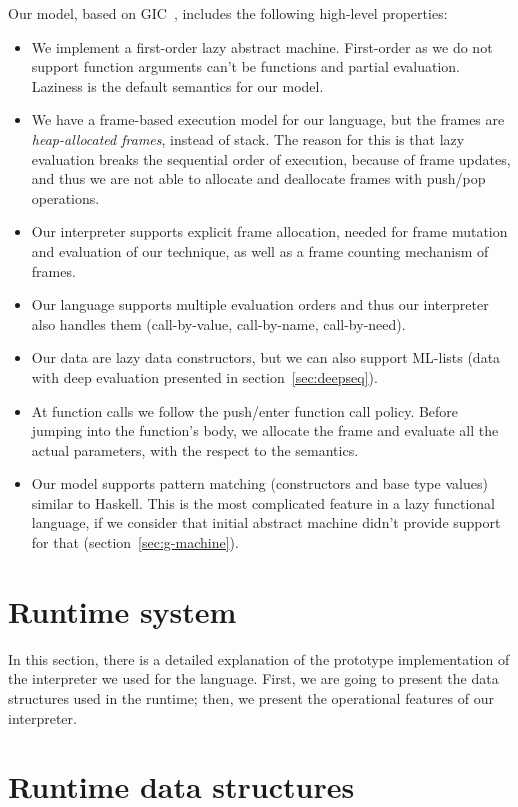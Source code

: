 \documentclass[diploma]{softlab-thesis}
\begin{document}
Our model, based on GIC~\cite{Fourtounis14}, 
includes the following high-level properties:
\begin{itemize}
  \item We implement a first-order lazy abstract machine. First-order as we do not support
  function arguments can't be functions and partial evaluation. Laziness is the default semantics
  for our model.
  \item We have a frame-based execution model for our language, but the frames are 
  \textit{heap-allocated frames}, instead of stack. The reason for this is that lazy evaluation 
  breaks the sequential order of execution, because of frame updates, and thus we are not able 
  to allocate and deallocate frames with push/pop operations.
  \item Our interpreter supports explicit frame allocation, needed for frame mutation and evaluation 
  of our technique, as well as a frame counting mechanism of frames.
  \item Our language supports multiple evaluation orders and thus our interpreter 
  also handles them (call-by-value, call-by-name, call-by-need).
  \item Our data are lazy data constructors, but we can also support ML-lists (data with deep evaluation
  presented in section~\ref{sec:deepseq}).
  \item At function calls we follow the push/enter function call policy. Before jumping into 
  the function's body, we allocate the frame and evaluate all the actual parameters, with the respect
  to the semantics. 
  \item Our model supports pattern matching (constructors and base type values) similar to Haskell. 
  This is the most complicated feature in a lazy functional language, if we consider that initial 
  abstract machine didn't provide support for that (section~\ref{sec:g-machine}).
\end{itemize}

\section {Runtime system}
\label{sec:runtime-system}

In this section, there is a detailed explanation of the prototype implementation of the interpreter we 
used for the language. First, we are going to present the data structures used in the runtime; then, 
we present the operational features of our interpreter. 

\section{Runtime data structures}
\end{document}
